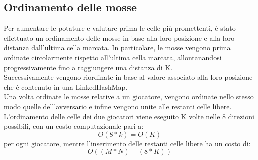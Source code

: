\subsection{Ordinamento delle mosse}
Per aumentare le potature e valutare prima le celle più promettenti, è stato effettuato un ordinamento delle mosse in base alla loro posizione e alla loro distanza dall'ultima cella marcata. In particolare, le mosse vengono prima ordinate circolarmente rispetto all'ultima cella marcata, allontanandosi progressivamente fino a raggiungere una distanza di K.\\
Successivamente vengono riordinate in base al valore associato alla loro posizione che è contenuto in una LinkedHashMap.\\
Una volta ordinate le mosse relative a un giocatore, vengono ordinate nello stesso modo quelle dell'avversario e infine vengono unite alle restanti celle libere.\\
L'ordinamento delle celle dei due giocatori viene eseguito K volte nelle 8 direzioni possibili, con un costo computazionale pari a:
\[ O(8 * k) = O(K) \]
per ogni giocatore, mentre l'inserimento delle restanti celle libere ha un costo di:  \[ O((M * N) - (8 * K)) \]

